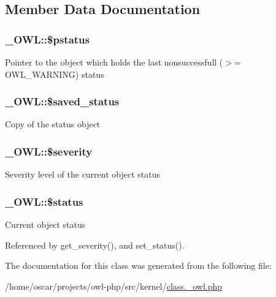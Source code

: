 \subsection{Member Data Documentation}
\subsubsection[{\$pstatus}]{\setlength{\rightskip}{0pt plus 5cm}\_\-OWL::\$pstatus}\label{class__OWL_af30c6ce2c59df6da2ef0f7059be9231e}
Pointer to the object which holds the last nonsuccessfull ($>$= OWL\_\-WARNING) status 
\subsubsection[{\$saved\_\-status}]{\setlength{\rightskip}{0pt plus 5cm}\_\-OWL::\$saved\_\-status}\label{class__OWL_a3fd6a7b2389b745c00a419dfb8cd7724}
Copy of the status object 
\subsubsection[{\$severity}]{\setlength{\rightskip}{0pt plus 5cm}\_\-OWL::\$severity}\label{class__OWL_ad26b40a9dbbacb33e299b17826f8327c}
Severity level of the current object status 
\subsubsection[{\$status}]{\setlength{\rightskip}{0pt plus 5cm}\_\-OWL::\$status}\label{class__OWL_aaf448f6bc8a90e20c09e9e2b8fe46eb5}
Current object status 

Referenced by get\_\-severity(), and set\_\-status().



The documentation for this class was generated from the following file:\begin{DoxyCompactItemize}
\item 
/home/oscar/projects/owl-\/php/src/kernel/\hyperlink{class_8__owl_8php}{class.\_\-owl.php}\end{DoxyCompactItemize}
